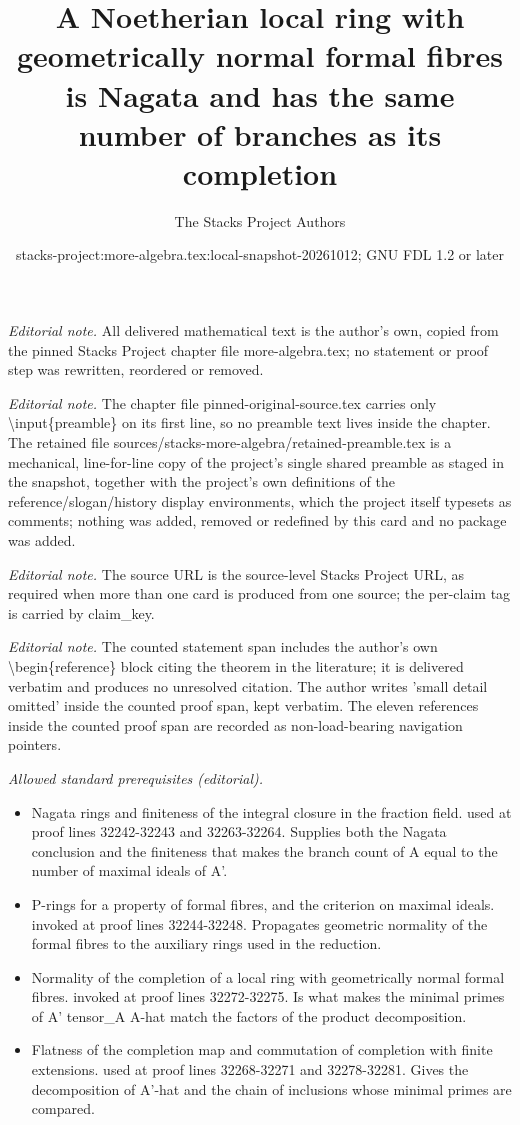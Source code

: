 \documentclass[10pt,a4paper]{amsart}
\title{A Noetherian local ring with geometrically normal formal fibres is Nagata and has the same number of branches as its completion}
\author{The Stacks Project Authors}
\date{stacks-project:more-algebra.tex:local-snapshot-20261012; GNU FDL 1.2 or later}
\theoremstyle{plain}
\theoremstyle{definition}
\theoremstyle{remark}
\numberwithin{equation}{subsection}
\begin{document}
\maketitle
\setcounter{subsection}{1}
\noindent\textit{Editorial note.} All delivered mathematical text is the author's own, copied from the pinned Stacks Project chapter file more-algebra.tex; no statement or proof step was rewritten, reordered or removed.\par\medskip
\noindent\textit{Editorial note.} The chapter file pinned-original-source.tex carries only \textbackslash{}input\{preamble\} on its first line, so no preamble text lives inside the chapter. The retained file sources/stacks-more-algebra/retained-preamble.tex is a mechanical, line-for-line copy of the project's single shared preamble as staged in the snapshot, together with the project's own definitions of the reference/slogan/history display environments, which the project itself typesets as comments; nothing was added, removed or redefined by this card and no package was added.\par\medskip
\noindent\textit{Editorial note.} The source URL is the source-level Stacks Project URL, as required when more than one card is produced from one source; the per-claim tag is carried by claim\_key.\par\medskip
\noindent\textit{Editorial note.} The counted statement span includes the author's own \textbackslash{}begin\{reference\} block citing the theorem in the literature; it is delivered verbatim and produces no unresolved citation. The author writes 'small detail omitted' inside the counted proof span, kept verbatim. The eleven references inside the counted proof span are recorded as non-load-bearing navigation pointers.\par\medskip
\noindent\textit{Allowed standard prerequisites (editorial).}\begin{itemize}
\item Nagata rings and finiteness of the integral closure in the fraction field. used at proof lines 32242-32243 and 32263-32264. Supplies both the Nagata conclusion and the finiteness that makes the branch count of A equal to the number of maximal ideals of A'.
\item P-rings for a property of formal fibres, and the criterion on maximal ideals. invoked at proof lines 32244-32248. Propagates geometric normality of the formal fibres to the auxiliary rings used in the reduction.
\item Normality of the completion of a local ring with geometrically normal formal fibres. invoked at proof lines 32272-32275. Is what makes the minimal primes of A' tensor\_A A-hat match the factors of the product decomposition.
\item Flatness of the completion map and commutation of completion with finite extensions. used at proof lines 32268-32271 and 32278-32281. Gives the decomposition of A'-hat and the chain of inclusions whose minimal primes are compared.
\end{itemize}\medskip
\end{document}
